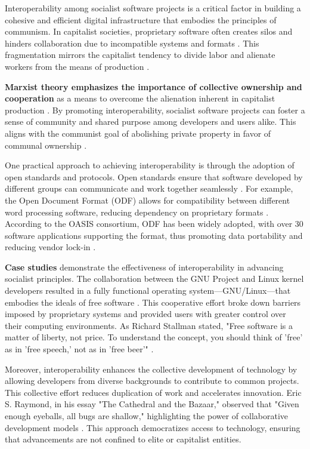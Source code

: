 \begin{refsection}
Interoperability among socialist software projects is a critical factor in building a cohesive and efficient digital infrastructure that embodies the principles of communism. In capitalist societies, proprietary software often creates silos and hinders collaboration due to incompatible systems and formats \cite[pp.~15--17]{Stallman2010}. This fragmentation mirrors the capitalist tendency to divide labor and alienate workers from the means of production \cite[pp.~71--72]{Marx2018}.

\textbf{Marxist theory emphasizes the importance of collective ownership and cooperation} as a means to overcome the alienation inherent in capitalist production \cite[pp.~102--105]{Marx2008}. By promoting interoperability, socialist software projects can foster a sense of community and shared purpose among developers and users alike. This aligns with the communist goal of abolishing private property in favor of communal ownership \cite[pp.~34--35]{Marx1959}.

One practical approach to achieving interoperability is through the adoption of open standards and protocols. Open standards ensure that software developed by different groups can communicate and work together seamlessly \cite[pp.~48--50]{Lessig2006}. For example, the Open Document Format (ODF) allows for compatibility between different word processing software, reducing dependency on proprietary formats \cite[pp.~22--24]{OASIS2015}. According to the OASIS consortium, ODF has been widely adopted, with over 30 software applications supporting the format, thus promoting data portability and reducing vendor lock-in \cite[pp.~5--7]{OASIS2015}.

\textbf{Case studies} demonstrate the effectiveness of interoperability in advancing socialist principles. The collaboration between the GNU Project and Linux kernel developers resulted in a fully functional operating system—GNU/Linux—that embodies the ideals of free software \cite[pp.~23--25]{Stallman2010}. This cooperative effort broke down barriers imposed by proprietary systems and provided users with greater control over their computing environments. As Richard Stallman stated, "Free software is a matter of liberty, not price. To understand the concept, you should think of 'free' as in 'free speech,' not as in 'free beer'" \cite[pp.~4]{Stallman2010}.

Moreover, interoperability enhances the collective development of technology by allowing developers from diverse backgrounds to contribute to common projects. This collective effort reduces duplication of work and accelerates innovation. Eric S. Raymond, in his essay "The Cathedral and the Bazaar," observed that "Given enough eyeballs, all bugs are shallow," highlighting the power of collaborative development models \cite[pp.~30]{Raymond2001}. This approach democratizes access to technology, ensuring that advancements are not confined to elite or capitalist entities.


\end{refsection}
